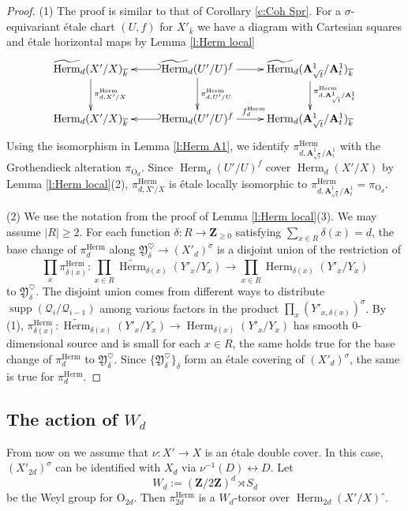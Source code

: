 \documentclass[reqno]{amsart}
\numberwithin{equation}{section}
\newcommand{\wt}[1]{\widetilde{#1}}
\newcommand{\Z}{\mathbf{Z}}
\newcommand{\A}{\mathbf{A}}
\DeclareMathOperator{\Herm}{Herm}
\DeclareMathOperator{\supp}{supp}
\newcommand{\bij}{\leftrightarrow}
\newcommand{\ov}{\overline}
\renewcommand\c{\circ}
\newcommand\Og{\mathrm{O}}
\renewcommand\d\delta
\newcommand{\s}{\sigma}
\newcommand\hs{\heartsuit}
\newcommand\cQ{\mathcal{Q}}
\newcommand\frY{\mathfrak{Y}}
\theoremstyle{remark}
\numberwithin{equation}{section}
\begin{document}
\begin{proof} 
(1) The proof is similar to that of Corollary \ref{c:Coh Spr}. For a $\s$-equivariant \'etale chart $(U,f)$ for $X'_{\ov k}$ we have a diagram with Cartesian squares and \'etale horizontal maps by Lemma \ref{l:Herm local}
\begin{equation}\label{SH chart}
\xymatrix{    \wt\Herm_{d}(X'/X)_{\ov k} \ar[d]^{\pi^{\Herm}_{d,X'/X}}& \wt\Herm_{d}(U'/U)^{f} \ar[r]\ar@{_{(}->}[l] \ar[d]^{\pi^{\Herm}_{d,U'/U}}& \wt\Herm_{d}(\A^{1}_{\sqrt{t}}/\A^{1}_{t}\ar[d]^{\pi^{\Herm}_{d, \A^{1}_{\sqrt{t}}/\A^{1}_{t}}})_{\ov k}        \\
\Herm_{d}(X'/X)_{\ov k}    & \Herm_{d}(U'/U)^{f}\ar[r]^{f^{\Herm}_{d}}\ar@{_{(}->}[l] & \Herm_{d}(\A^{1}_{\sqrt{t}}/\A^{1}_{t})_{\ov k}     }
\end{equation}
Using the isomorphism in Lemma \ref{l:Herm A1}, we identify $\pi^{\Herm}_{d, \A^{1}_{\sqrt{t}}/\A^{1}_{t}}$ with the Grothendieck alteration $\pi_{\Og_{d}}$.  Since $\Herm_{d}(U'/U)^{f}$ cover $\Herm_{d}(X'/X)$ by Lemma \ref{l:Herm local}(2), $\pi^{\Herm}_{d,X'/X}$ is 
\'etale locally  isomorphic to $\pi^{\Herm}_{d, \A^{1}_{\sqrt{t}}/\A^{1}_{t}}=\pi_{\Og_{d}}$.

(2) We use the notation from the proof of Lemma \ref{l:Herm local}(3). We may assume $|R|\ge2$. For each function $\d: R\to \Z_{\ge0}$ satisfying $\sum_{x\in R}\d(x)=d$, the base change of $\pi^{\Herm}_{d}$ along $\frY_{\d}^{\hs}\to (X'_{d})^{\s}$ is a disjoint union of the restriction of
\begin{equation*}
\prod_{x}\pi^{\Herm}_{\d(x)}: \prod_{x\in R}\wt\Herm_{\d(x)}(Y'_{x}/Y_{x})\to \prod_{x\in R}\Herm_{\d(x)}(Y'_{x}/Y_{x})
\end{equation*}
to $\frY_{\d}^{\hs}$. The disjoint union comes from different ways to distribute $\supp(\cQ_{i}/\cQ_{i-1})$ among various factors in the product $\prod_{x}(Y'_{x,\d(x)})^{\s}$. By (1), $\pi^{\Herm}_{\d(x)}: \wt\Herm_{\d(x)}(Y'_{x}/Y_{x})\to \Herm_{\d(x)}(Y'_{x}/Y_{x})$ has smooth $0$-dimensional source and is small for each $x\in R$, the same holds true for the base change of $\pi^{\Herm}_{d}$ to $\frY_{\d}^{\hs}$. Since $\{\frY_{\d}^{\hs}\}_{\d}$ form an \'etale covering of $(X'_{d})^{\s}$, the same is true for $\pi^{\Herm}_{d}$.
\end{proof}


\subsection{The action of $W_{d}$} \label{ss:Wd act} 
From now on we assume that $\nu:X'\to X$ is an \'etale double cover.  In this case, $(X'_{2d})^{\s}$ can be identified with $X_{d}$ via $\nu^{-1}(D)\bij D$. Let
\begin{equation*}
W_{d}:=(\Z/2\Z)^{d}\rtimes S_{d}
\end{equation*}
be the Weyl group for $\Og_{2d}$. Then $\pi^{\Herm}_{2d}$ is a $W_{d}$-torsor over $\Herm_{2d}(X'/X)^{\c}$.  
\end{document}
